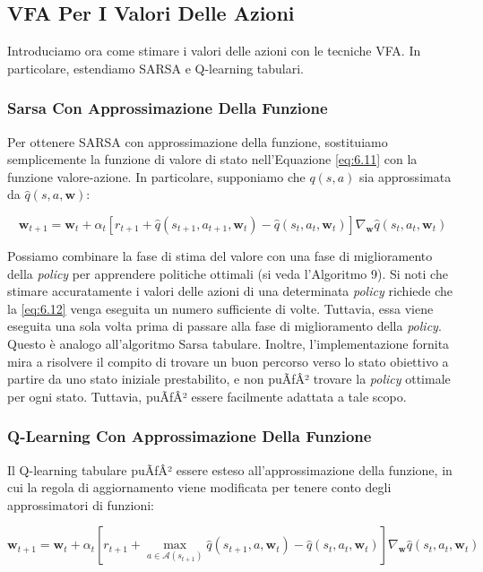 ﻿\documentclass[11pt, a4paper]{report}
\begin{document}
\subsection{VFA Per I Valori Delle Azioni}

Introduciamo ora come stimare i valori delle azioni con le tecniche VFA. In particolare, estendiamo SARSA e Q-learning tabulari.

\subsubsection{Sarsa Con Approssimazione Della Funzione}

Per ottenere SARSA con approssimazione della funzione, sostituiamo semplicemente la funzione di valore di stato nell'Equazione \eqref{eq:6.11} con la funzione valore-azione. In particolare, supponiamo che $q(s, a)$ sia approssimata da $\hat{q}(s, a, \bm{w})$:

\[
\bm{w}_{t+1} = \bm{w}_t + \alpha_t [ r_{t+1} + \hat{q}(s_{t+1}, a_{t+1}, \bm{w}_t) - \hat{q}(s_t, a_t, \bm{w}_t) ] \nabla_{\bm{w}} \hat{q}(s_t, a_t, \bm{w}_t) \tag{6.12}
\]

Possiamo combinare la fase di stima del valore con una fase di miglioramento della \emph{policy} per apprendere politiche ottimali (si veda l'Algoritmo 9). Si noti che stimare accuratamente i valori delle azioni di una determinata \emph{policy} richiede che la \eqref{eq:6.12} venga eseguita un numero sufficiente di volte. Tuttavia, essa viene eseguita una sola volta prima di passare alla fase di miglioramento della \emph{policy}. Questo è analogo all'algoritmo Sarsa tabulare. Inoltre, l'implementazione fornita mira a risolvere il compito di trovare un buon percorso verso lo stato obiettivo a partire da uno stato iniziale prestabilito, e non puÃƒÂ² trovare la \emph{policy} ottimale per ogni stato. Tuttavia, puÃƒÂ² essere facilmente adattata a tale scopo.

\subsubsection{Q-Learning Con Approssimazione Della Funzione}

Il Q-learning tabulare puÃƒÂ² essere esteso all'approssimazione della funzione, in cui la regola di aggiornamento viene modificata per tenere conto degli approssimatori di funzioni:

\[
\bm{w}_{t+1} = \bm{w}_t + \alpha_t \left[ r_{t+1} + \max_{a \in \mathcal{A}(s_{t+1})} \hat{q}(s_{t+1}, a, \bm{w}_t) - \hat{q}(s_t, a_t, \bm{w}_t) \right] \nabla_{\bm{w}}\hat{q}(s_t, a_t, \bm{w}_t) \tag{6.13}
\]
\end{document}
